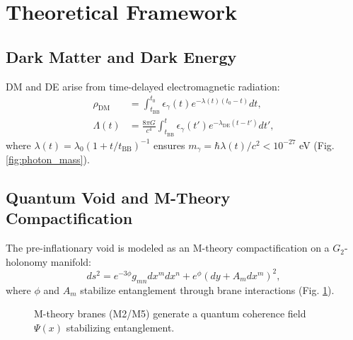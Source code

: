 \documentclass[12pt, a4paper]{article}
\begin{document}
\section{Theoretical Framework}
\subsection{Dark Matter and Dark Energy}
DM and DE arise from time-delayed electromagnetic radiation:
\begin{align}
\rho_{\text{DM}} &= \int_{t_{\text{BB}}}^{t_0} \epsilon_{\gamma}(t) e^{-\lambda(t)(t_0 - t)} dt, \label{eq:dm} \\
\Lambda(t) &= \frac{8\pi G}{c^4} \int_{t_{\text{BB}}}^{t} \epsilon_{\gamma}(t') e^{-\lambda_{\text{DE}}(t - t')} dt', \label{eq:de}
\end{align}
where \(\lambda(t) = \lambda_0 \left(1 + t/t_{\text{BB}}\right)^{-1}\) ensures \(m_\gamma = \hbar \lambda(t)/c^2 < 10^{-27}\) eV (Fig. \ref{fig:photon_mass}).

\subsection{Quantum Void and M-Theory Compactification}
The pre-inflationary void is modeled as an M-theory compactification on a \(G_2\)-holonomy manifold:
\begin{equation}
ds^2 = e^{-3\phi} g_{mn} dx^m dx^n + e^{\phi} (dy + A_m dx^m)^2, \label{eq:G2}
\end{equation}
where \(\phi\) and \(A_m\) stabilize entanglement through brane interactions (Fig. \ref{fig:mtheory}).

\begin{figure}[h]
\centering
{}
\caption{M-theory branes (M2/M5) generate a quantum coherence field \(\Psi(x)\) stabilizing entanglement.}
\label{fig:mtheory}
\end{figure}
\end{document}
